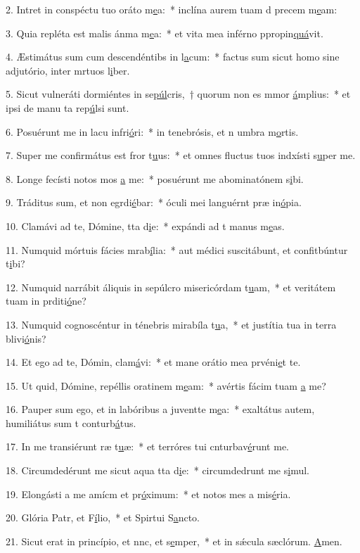 2. Intret in conspéctu tuo oráto m\uline{e}a:~* inclína aurem tuam d precem m\uline{e}am:\par 
3. Quia repléta est malis ánma m\uline{e}a:~* et vita mea inférno ppropin\uline{quá}vit.\par 
4. Æstimátus sum cum descendéntibs in l\uline{a}cum:~* factus sum sicut homo sine adjutório, inter mrtuos l\uline{i}ber.\par 
5. Sicut vulneráti dormiéntes in se\uline{púl}cris,~† quorum non es mmor \uline{á}mplius:~* et ipsi de manu ta rep\uline{ú}lsi sunt.\par 
6. Posuérunt me in lacu infri\uline{ó}ri:~* in tenebrósis, et n umbra m\uline{o}rtis.\par 
7. Super me confirmátus est fror t\uline{u}us:~* et omnes fluctus tuos indxísti s\uline{u}per me.\par 
8. Longe fecísti notos mos \uline{a} me:~* posuérunt me abominatónem s\uline{i}bi.\par 
9. Tráditus sum, et non egrdi\uline{é}bar:~* óculi mei languérnt præ in\uline{ó}pia.\par 
10. Clamávi ad te, Dómine, tta d\uline{i}e:~* expándi ad t manus m\uline{e}as.\par 
11. Numquid mórtuis fácies mrab\uline{í}lia:~* aut médici suscitábunt, et confitbúntur t\uline{i}bi?\par 
12. Numquid narrábit áliquis in sepúlcro misericórdam t\uline{u}am,~* et veritátem tuam in prditi\uline{ó}ne?\par 
13. Numquid cognoscéntur in ténebris mirabíla t\uline{u}a,~* et justítia tua in terra blivi\uline{ó}nis?\par 
14. Et ego ad te, Dómin, clam\uline{á}vi:~* et mane orátio mea prvéni\uline{e}t te.\par 
15. Ut quid, Dómine, repéllis oratinem m\uline{e}am:~* avértis fácim tuam \uline{a} me?\par 
16. Pauper sum ego, et in labóribus a juventte m\uline{e}a:~* exaltátus autem, humiliátus sum t conturb\uline{á}tus.\par 
17. In me transiérunt ræ t\uline{u}æ:~* et terróres tui cnturbav\uline{é}runt me.\par 
18. Circumdedérunt me sicut aqua tta d\uline{i}e:~* circumdedrunt me s\uline{i}mul.\par 
19. Elongásti a me amícm et pr\uline{ó}ximum:~* et notos mes a mis\uline{é}ria.\par 
20. Glória Patr, et F\uline{í}lio,~* et Spirtui S\uline{a}ncto.\par 
21. Sicut erat in princípio, et nnc, et s\uline{e}mper,~* et in sǽcula sæclórum. \uline{A}men.\par 
